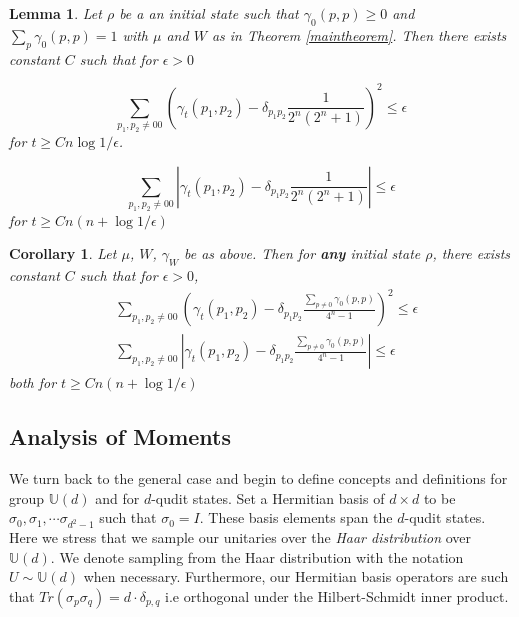 \documentclass[12pt]{amsart}
\newtheorem{corollary}{Corollary}[theorem]
\newtheorem{lemma}[theorem]{Lemma}
\theoremstyle{definition}
\theoremstyle{remark}
\numberwithin{equation}{section}
\theoremstyle{remark}
\begin{document}
%
\begin{lemma} \label{mainlemma}
  Let $\rho$ be a an initial state such that $\gamma_0(p,p) \geq 0$ and $\sum_{p} \gamma_0(p,p) = 1$ with $\mu$ and $W$ as in Theorem \ref{maintheorem}. Then there exists constant $C$ such that for $\epsilon > 0$

  \begin{equation}
    \sum_{p_1,p_2 \neq 00} \left( \gamma_t(p_1,p_2) - \delta_{p_1p_2} \frac{1}{2^n(2^n + 1)} \right)^2 \leq \epsilon
  \end{equation}
  for $t \geq Cn\log 1/\epsilon$.

  \begin{equation}
    \sum_{p_1,p_2 \neq 00} \left| \gamma_t(p_1,p_2) - \delta_{p_1p_2} \frac{1}{2^n(2^n + 1)} \right| \leq \epsilon
  \end{equation}
  for $t \geq Cn(n + \log 1/\epsilon)$
\end{lemma}

\begin{corollary} \label{maincorollary}
  Let $\mu$, $W$, $\gamma_W$ be as above. Then for \emph{\bf any} initial state $\rho$, there exists constant $C$ such that for $\epsilon > 0$,
  \begin{align}
    & \sum_{p_1,p_2 \neq 00} \left( \gamma_t(p_1,p_2) - \delta_{p_1p_2}\frac{\sum_{p\neq 0} \gamma_0(p,p)}{4^n - 1} \right)^2 \leq \epsilon \\
    & \sum_{p_1,p_2 \neq 00} \left| \gamma_t(p_1,p_2) - \delta_{p_1p_2}\frac{\sum_{p\neq 0} \gamma_0(p,p)}{4^n - 1} \right| \leq \epsilon
  \end{align}
  both for $t \geq Cn(n + \log 1/ \epsilon)$
\end{corollary}

\subsection{Analysis of Moments}

We turn back to the general case and begin to define concepts and definitions for group $\mathbb{U}(d)$ and for $d$-qudit states. Set a Hermitian basis of $d \times d$ to be $\sigma_0,\sigma_1,\cdots \sigma_{d^2 -1}$ such that $\sigma_0 = I$. These basis elements span the $d$-qudit states. Here we stress that we sample our unitaries over the \emph{Haar distribution} over $\mathbb{U}(d)$. We denote sampling from the Haar distribution with the notation $U \sim \mathbb{U}(d)$ when necessary. Furthermore, our Hermitian basis operators are such that $Tr(\sigma_p\sigma_q) = d \cdot \delta_{p,q}$ i.e orthogonal under the Hilbert-Schmidt inner product. \newline
\end{document}

